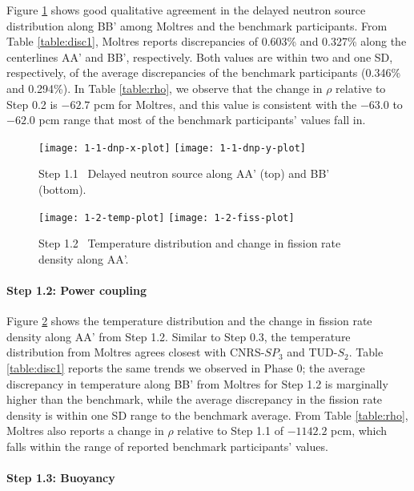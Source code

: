 Figure \ref{fig:1.1} shows good qualitative agreement in the delayed neutron
source distribution along BB' among Moltres and the benchmark participants.
From Table \ref{table:disc1}, Moltres reports discrepancies of 0.603\% and
0.327\% along the centerlines AA' and BB', respectively. Both values are
within two and one \gls{SD}, respectively, of the average discrepancies of the
benchmark participants (0.346\% and 0.294\%).
In Table \ref{table:rho}, we observe that the change in
$\rho$ relative to Step 0.2 is $-62.7$ pcm for Moltres, and this value is
consistent with the $-63.0$ to $-62.0$ pcm range that most of the benchmark
participants' values fall in.
%
\begin{figure}[htb]
	\centering
    \texttt{[image: 1-1-dnp-x-plot]}
    \texttt{[image: 1-1-dnp-y-plot]}
	\caption{Step 1.1 \textemdash\ Delayed neutron source along AA' (top) and BB'
	(bottom).}
	\label{fig:1.1}
\end{figure}
%
\begin{figure}[htb]
	\centering
	\texttt{[image: 1-2-temp-plot]}
	\texttt{[image: 1-2-fiss-plot]}
	\caption{Step 1.2 \textemdash\ Temperature distribution and change in fission rate
	density along AA'.}
	\label{fig:1.2}
\end{figure}

\FloatBarrier

\paragraph{Step 1.2: Power coupling}

Figure \ref{fig:1.2} shows the temperature distribution and the change in
fission rate density along AA' from Step 1.2. Similar to Step 0.3, the
temperature distribution from Moltres agrees closest with CNRS-$SP_3$ and
TUD-$S_2$. Table \ref{table:disc1} reports the same trends we observed in Phase
0; the average discrepancy in temperature along BB' from Moltres for Step 1.2
is marginally higher than the benchmark, while the average discrepancy in the
fission rate density is within one \gls{SD} range to the benchmark average.
From Table \ref{table:rho}, Moltres also reports a change in $\rho$
relative to Step 1.1 of $-1142.2$ pcm, which
falls within the range of reported benchmark participants' values.

\paragraph{Step 1.3: Buoyancy}

